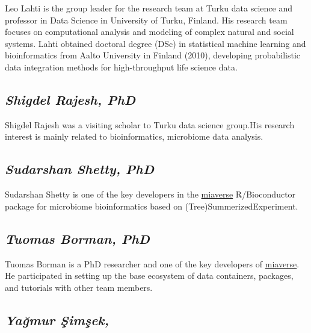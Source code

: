 \documentclass[
]{book}
\begin{document}
Leo Lahti is the group leader for the research team at Turku data science and professor in Data Science in University of Turku, Finland. His research team focuses on computational analysis and modeling of complex natural and social systems. Lahti obtained doctoral degree (DSc) in statistical machine learning and bioinformatics from Aalto University in Finland (2010), developing probabilistic data integration methods for high-throughput life science data.

\hypertarget{shigdel-rajesh-phd}{%
\subsection*{\texorpdfstring{\emph{Shigdel Rajesh, PhD}}{Shigdel Rajesh, PhD}}\label{shigdel-rajesh-phd}}

Shigdel Rajesh was a visiting scholar to Turku data science group.His research interest is mainly related to bioinformatics, microbiome data analysis.

\hypertarget{sudarshan-shetty-phd}{%
\subsection*{\texorpdfstring{\emph{Sudarshan Shetty, PhD}}{Sudarshan Shetty, PhD}}\label{sudarshan-shetty-phd}}

Sudarshan Shetty is one of the key developers in the \href{https://microbiome.github.io}{miaverse} R/Bioconductor package for microbiome bioinformatics based on (Tree)SummerizedExperiment.

\hypertarget{tuomas-borman-phd}{%
\subsection*{\texorpdfstring{\emph{Tuomas Borman, PhD}}{Tuomas Borman, PhD}}\label{tuomas-borman-phd}}

Tuomas Borman is a PhD researcher and one of the key developers of \href{https://microbiome.github.io}{miaverse}. He participated in setting up the base ecosystem of data containers, packages, and tutorials with other team members.

\hypertarget{yaux11fmur-ux15fimux15fek}{%
\subsection*{\texorpdfstring{\emph{Yağmur Şimşek, }}{Yağmur Şimşek, }}\label{yaux11fmur-ux15fimux15fek}}
\end{document}
